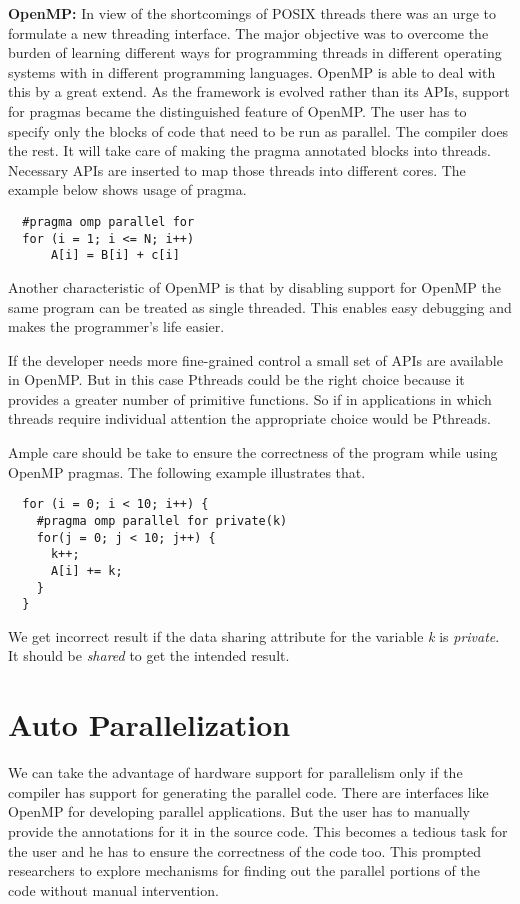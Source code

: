 
\textbf{OpenMP:} In view of the shortcomings of POSIX threads there was an urge to formulate a new threading
interface. The major objective was to overcome the burden of learning different ways for programming threads in different
operating systems with in different programming languages. OpenMP is able to deal with this
by a great extend. As the framework is evolved rather than its APIs, support for pragmas became the distinguished
feature of OpenMP. The user has to specify only the blocks of code that need to be run
as parallel. The compiler does the rest. It will take care of making the pragma annotated blocks into
threads. Necessary APIs are inserted to map those threads into different cores. The example below
shows usage of pragma.

{\footnotesize
\begin{lstlisting}
  #pragma omp parallel for
  for (i = 1; i <= N; i++)
      A[i] = B[i] + c[i]
\end{lstlisting}
}

Another characteristic of OpenMP is that by disabling support for OpenMP the same program can be treated as
single threaded. This enables easy debugging and makes the programmer's life easier.

If the developer needs more fine-grained control a small set of APIs are available in OpenMP. But in this case Pthreads
could be the right choice because it provides a greater number of primitive functions. So if in applications
in which threads require individual attention the appropriate choice would be Pthreads.

Ample care should be take to ensure the correctness of the program while using OpenMP pragmas. The following
example illustrates that.
{\footnotesize
\begin{lstlisting}
  for (i = 0; i < 10; i++) {
    #pragma omp parallel for private(k)
    for(j = 0; j < 10; j++) {
      k++;
      A[i] += k;
    }
  }
\end{lstlisting}
}

We get incorrect result if the data sharing attribute for the variable \emph{k} is \emph {private}. It should
be \emph{shared} to get the intended result.



\section{Auto Parallelization}
We can take the advantage of hardware support for parallelism only if the compiler has
support for generating the parallel code. There are interfaces like OpenMP for
developing parallel applications. But the user has to manually provide the annotations
for it in the source code. This becomes a tedious task for the user and he has to
ensure the correctness of the code too. This prompted researchers to explore
mechanisms for finding out the parallel portions of the code without manual intervention.

